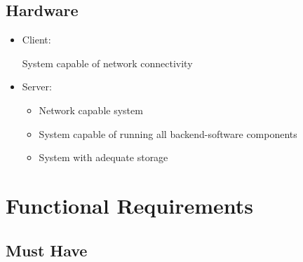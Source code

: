 \documentclass[twoside, english, final]{Pflichtenheft}
\begin{document}
\subsection{Hardware}
\begin{itemize}
	\item{Client:}
	      \begin{itemize}
		      System capable of network connectivity
	      \end{itemize}

	\item{Server:}
	      \begin{itemize}
		      \item{Network capable system}
		      \item{System capable of running all backend-software components}
		      \item{System with adequate storage}
	      \end{itemize}

\end{itemize}

\section{Functional Requirements}
\subsection{Must Have}
\end{document}
